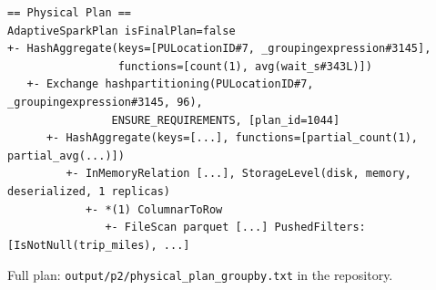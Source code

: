 \documentclass[10pt,a4paper]{article}
\begin{document}
{\footnotesize
\begin{verbatim}
== Physical Plan ==
AdaptiveSparkPlan isFinalPlan=false
+- HashAggregate(keys=[PULocationID#7, _groupingexpression#3145],
                 functions=[count(1), avg(wait_s#343L)])
   +- Exchange hashpartitioning(PULocationID#7, _groupingexpression#3145, 96),
                ENSURE_REQUIREMENTS, [plan_id=1044]
      +- HashAggregate(keys=[...], functions=[partial_count(1), partial_avg(...)])
         +- InMemoryRelation [...], StorageLevel(disk, memory, deserialized, 1 replicas)
            +- *(1) ColumnarToRow
               +- FileScan parquet [...] PushedFilters: [IsNotNull(trip_miles), ...]
\end{verbatim}}
\vspace{-0.6em}
\noindent Full plan: \texttt{output/p2/physical\_plan\_groupby.txt} in the repository.
\end{document}
